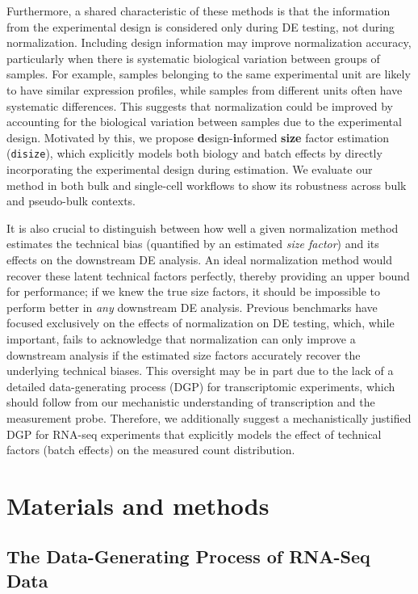 \documentclass[10pt,letterpaper]{article}
\begin{document}
Furthermore, a shared characteristic of these methods is that the information from the experimental design is considered only during DE testing, not during normalization.
Including design information may improve normalization accuracy, particularly when there is systematic biological variation between groups of samples.
For example, samples belonging to the same experimental unit are likely to have similar expression profiles, while samples from different units often have systematic differences.
This suggests that normalization could be improved by accounting for the biological variation between samples due to the experimental design.
Motivated by this, we propose \textbf{d}esign-\textbf{i}nformed \textbf{size} factor estimation (\texttt{disize}), which explicitly models both biology and batch effects by directly incorporating the experimental design during estimation.
We evaluate our method in both bulk and single-cell workflows to show its robustness across bulk and pseudo-bulk contexts.

It is also crucial to distinguish between how well a given normalization method estimates the technical bias (quantified by an estimated \textit{size factor}) and its effects on the downstream DE analysis.
An ideal normalization method would recover these latent technical factors perfectly, thereby providing an upper bound for performance; if we knew the true size factors, it should be impossible to perform better in \textit{any} downstream DE analysis.
Previous benchmarks have focused exclusively on the effects of normalization on DE testing, which, while important, fails to acknowledge that normalization can only improve a downstream analysis if the estimated size factors accurately recover the underlying technical biases.
This oversight may be in part due to the lack of a detailed data-generating process (DGP) for transcriptomic experiments, which should follow from our mechanistic understanding of transcription and the measurement probe.
Therefore, we additionally suggest a mechanistically justified DGP for RNA-seq experiments that explicitly models the effect of technical factors (batch effects) on the measured count distribution.

\section*{Materials and methods}
\subsection*{The Data-Generating Process of RNA-Seq Data}
\end{document}
